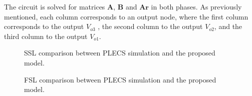 The circuit is solved for matrices $\mathbf{A}$, $\mathbf{B}$ and $\mathbf{Ar}$ in both phases. As previously mentioned,
each column corresponds to an output node, where the first column corresponds to the output $V_{o3}$ , the second column
to the output $V_{o2}$, and the third column to the output $V_{o1}$.

\begin{figure*}[t]
  \centering
  \caption{SSL comparison between PLECS simulation and the proposed model.}
  \label{fig:sim_ssl}
\end{figure*}


\begin{figure*}[t]
  \centering
  \caption{FSL comparison between PLECS simulation and the proposed model.}
  \label{fig:sim_fsl}
\end{figure*}

